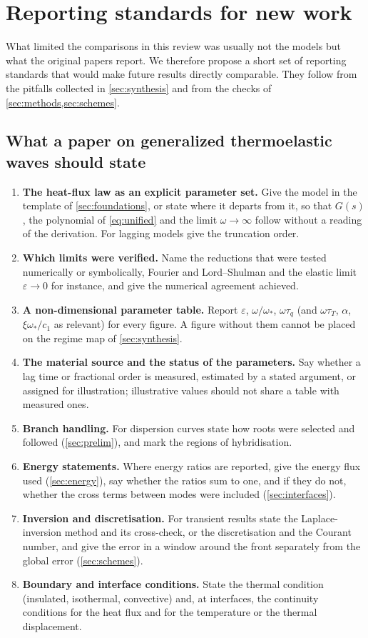 \section{Reporting standards for new work}\label{sec:reporting}

What limited the comparisons in this review was usually not the models but what the original papers report. We therefore propose a short set of reporting standards that would make future results directly comparable. They follow from the pitfalls collected in \cref{sec:synthesis} and from the checks of \cref{sec:methods,sec:schemes}.

\subsection{What a paper on generalized thermoelastic waves should state}
\begin{enumerate}
\item \textbf{The heat-flux law as an explicit parameter set.} Give the model in the template of \cref{sec:foundations}, or state where it departs from it, so that $G(s)$, the polynomial of \cref{eq:unified} and the limit $\omega\to\infty$ follow without a reading of the derivation. For lagging models give the truncation order.
\item \textbf{Which limits were verified.} Name the reductions that were tested numerically or symbolically, Fourier and Lord--Shulman and the elastic limit $\varepsilon\to0$ for instance, and give the numerical agreement achieved.
\item \textbf{A non-dimensional parameter table.} Report $\varepsilon$, $\omega/\omega_*$, $\omega\tau_q$ (and $\omega\tau_T$, $\alpha$, $\xi\omega_*/c_1$ as relevant) for every figure. A figure without them cannot be placed on the regime map of \cref{sec:synthesis}.
\item \textbf{The material source and the status of the parameters.} Say whether a lag time or fractional order is measured, estimated by a stated argument, or assigned for illustration; illustrative values should not share a table with measured ones.
\item \textbf{Branch handling.} For dispersion curves state how roots were selected and followed (\cref{sec:prelim}), and mark the regions of hybridisation.
\item \textbf{Energy statements.} Where energy ratios are reported, give the energy flux used (\cref{sec:energy}), say whether the ratios sum to one, and if they do not, whether the cross terms between modes were included (\cref{sec:interfaces}).
\item \textbf{Inversion and discretisation.} For transient results state the Laplace-inversion method and its cross-check, or the discretisation and the Courant number, and give the error in a window around the front separately from the global error (\cref{sec:schemes}).
\item \textbf{Boundary and interface conditions.} State the thermal condition (insulated, isothermal, convective) and, at interfaces, the continuity conditions for the heat flux and for the temperature or the thermal displacement.
\end{enumerate}

